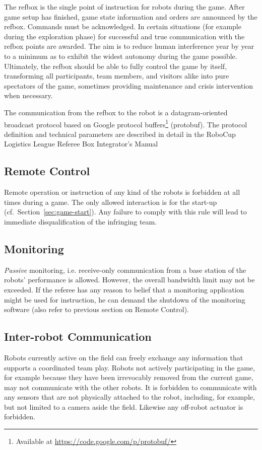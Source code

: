 \documentclass[12pt,twoside]{article}
\newcommand{\refsec}[1]{Section~\ref{#1}}
\begin{document}
The refbox is the single point of instruction for robots during the
game. After game setup has finished, game state information and orders
are announced by the refbox. Commands must be acknowledged. In certain
situations (for example during the exploration phase) for successful
and true communication with the refbox points are awarded. The aim is
to reduce human interference year by year to a minimum as to exhibit
the widest autonomy during the game possible. Ultimately, the refbox
should be able to fully control the game by itself, transforming all
participants, team members, and visitors alike into pure spectators of
the game, sometimes providing maintenance and crisis intervention when
necessary.

The communication from the refbox to the robot is a datagram-oriented
broadcast protocol based on Google protocol buffers\footnote{Available
  at \url{https://code.google.com/p/protobuf/}} (protobuf). The
protocol definition and technical parameters are described in detail
in the RoboCup Logistics League Referee Box Integrator's
Manual~\cite{RefBoxIntManual}

\subsection{Remote Control}
\label{sec:remote-control}
Remote operation or instruction of any kind of the robots is forbidden
at all times during a game. The only allowed interaction is for the
start-up (cf.~\refsec{sec:game-start}). Any failure to comply with
this rule will lead to immediate disqualification of the infringing
team.

\subsection{Monitoring}
\label{sec:monitoring}
\emph{Passive} monitoring, i.e. receive-only communication from a base
station of the robots' performance is allowed. However, the overall
bandwidth limit may not be exceeded.
If the referee has any reason to belief that a monitoring application
might be used for instruction, he can demand the shutdown of the
monitoring software (also refer to previous section on Remote
Control).

\subsection{Inter-robot Communication}
\label{sec:inter-robot-comm}
Robots currently active on the field can freely exchange any
information that supports a coordinated team play. Robots not actively
participating in the game, for example because they have been
irrevocably removed from the current game, may not communicate with
the other robots. It is forbidden to communicate with any sensors that
are not physically attached to the robot, including, for example, but
not limited to a camera aside the field. Likewise any off-robot
actuator is forbidden.
\end{document}
